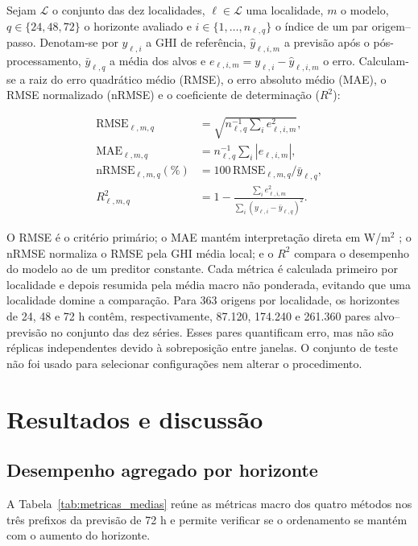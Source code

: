 \documentclass[10pt,conference,a4paper]{IEEEtran}
\begin{document}
Sejam $\mathcal L$ o conjunto das dez localidades, $\ell\in\mathcal L$ uma
localidade, $m$ o modelo, $q\in\{24,48,72\}$ o horizonte avaliado e
$i\in\{1,\ldots,n_{\ell,q}\}$ o índice de um par origem--passo. Denotam-se por
$y_{\ell,i}$ a GHI de referência, $\widehat y_{\ell,i,m}$ a previsão após o
pós-processamento, $\bar y_{\ell,q}$ a média dos alvos e
$e_{\ell,i,m}=y_{\ell,i}-\widehat y_{\ell,i,m}$ o erro. Calculam-se a raiz do
erro quadrático médio (RMSE), o erro absoluto médio (MAE), o RMSE normalizado
(nRMSE) e o coeficiente de determinação ($R^2$):

\begin{align}
 \mathrm{RMSE}_{\ell,m,q}
 &=\sqrt{n_{\ell,q}^{-1}\sum_i e_{\ell,i,m}^2},\label{eq:rmse}\\
 \mathrm{MAE}_{\ell,m,q}
 &=n_{\ell,q}^{-1}\sum_i|e_{\ell,i,m}|,\label{eq:mae}\\
 \mathrm{nRMSE}_{\ell,m,q}(\%)
 &=100\,\mathrm{RMSE}_{\ell,m,q}/\bar y_{\ell,q},\label{eq:nrmse}\\
 R^2_{\ell,m,q}
 &=1-\frac{\sum_i e_{\ell,i,m}^2}
 {\sum_i(y_{\ell,i}-\bar y_{\ell,q})^2}.\label{eq:r2}
\end{align}

O RMSE é o critério primário; o MAE mantém interpretação direta em W/m$^2$
\cite{hyndman2006}; o nRMSE normaliza o RMSE pela GHI média local; e o $R^2$
compara o desempenho do modelo ao de um preditor constante. Cada métrica é
calculada primeiro por localidade e depois resumida pela média macro não
ponderada, evitando que uma localidade domine
a comparação.
Para 363 origens por localidade, os horizontes de 24, 48 e 72 h contêm,
respectivamente, 87.120, 174.240 e 261.360 pares alvo--previsão no conjunto das
dez séries. Esses pares quantificam erro, mas não são réplicas independentes
devido à sobreposição entre janelas. O conjunto de teste não foi usado para
selecionar configurações nem alterar o procedimento.

\section{Resultados e discussão}
\label{sec:resultados}

\subsection{Desempenho agregado por horizonte}

A Tabela~\ref{tab:metricas_medias} reúne as métricas macro dos quatro métodos
nos três prefixos da previsão de 72 h e permite verificar se o ordenamento se
mantém com o aumento do horizonte.
\end{document}
